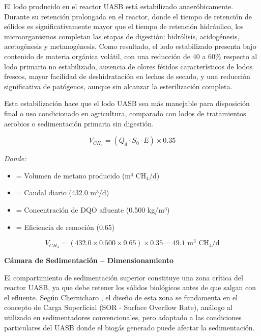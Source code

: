 \documentclass[12pt,a4paper]{article}
\newcommand{\captionequation}[1]{}  %
\begin{document}
El lodo producido en el reactor UASB está estabilizado anaeróbicamente. Durante su retención prolongada en el reactor, donde el tiempo de retención de sólidos es significativamente mayor que el tiempo de retención hidráulico, los microorganismos completan las etapas de digestión: hidrólisis, acidogénesis, acetogénesis y metanogénesis. Como resultado, el lodo estabilizado presenta bajo contenido de materia orgánica volátil, con una reducción de 40 a 60\% respecto al lodo primario no estabilizado, ausencia de olores fétidos característicos de lodos frescos, mayor facilidad de deshidratación en lechos de secado, y una reducción significativa de patógenos, aunque sin alcanzar la esterilización completa.

Esta estabilización hace que el lodo UASB sea más manejable para disposición final o uso condicionado en agricultura, comparado con lodos de tratamientos aerobios o sedimentación primaria sin digestión.

\begin{equation}
V_{CH_4} = (Q_d \cdot S_0 \cdot E) \times 0.35
\end{equation}
\captionequation{Produccion de biogas - Relacion estequiometrica}

\textit{Donde:}
\begin{itemize}[noitemsep,leftmargin=2em]
    \item[$V_{CH_4}$] = Volumen de metano producido (m³ CH$_4$/d)
    \item[$Q_d$] = Caudal diario (432.0 m³/d)
    \item[$S_0$] = Concentración de DQO afluente (0.500 kg/m³)
    \item[$E$] = Eficiencia de remoción (0.65)
\end{itemize}

\begin{equation}
V_{CH_4} = (432.0 \times 0.500 \times 0.65) \times 0.35 = 49.1 \text{ m}^3 \text{ CH}_4\text{/d}
\end{equation}

\textbf{Cámara de Sedimentación -- Dimensionamiento}

El compartimiento de sedimentación superior constituye una zona crítica del reactor UASB, ya que debe retener los sólidos biológicos antes de que salgan con el efluente. Según Chernicharo \cite{chernicharo2007}, el diseño de esta zona se fundamenta en el concepto de Carga Superficial (SOR - Surface Overflow Rate), análogo al utilizado en sedimentadores convencionales, pero adaptado a las condiciones particulares del UASB donde el biogás generado puede afectar la sedimentación.
\end{document}
